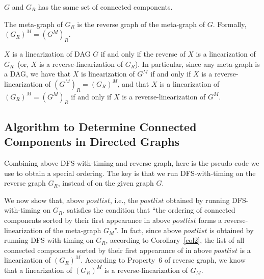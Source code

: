 \begin{property}
$G$ and $G_R$ has the same set of connected components. %
\end{property}


\begin{property}
The meta-graph of $G_R$ is the reverse graph of the meta-graph of $G$. Formally, $(G_R)^M = (G^M)_R$.
\end{property}

\begin{property}
$X$ is a linearization of DAG $G$ if and only if the reverse of $X$ is a linearization of $G_R$~(or, $X$ is a reverse-linearization of $G_R$).
In particular, since any meta-graph is a DAG, we have that 
$X$ is linearization of $G^M$ if and only if $X$ is a reverse-linearization of $(G^M)_R = (G_R)^M$,
and that $X$ is a linearization of $(G_R)^M = (G^M)_R$ if and only if $X$ is a reverse-linearization of $G^M$.
\end{property}


\subsection*{Algorithm to Determine Connected Components in Directed Graphs}

Combining above DFS-with-timing and reverse graph, here is the pseudo-code we use to obtain a special ordering.
The key is that we run DFS-with-timing on the reverse graph $G_R$, instead of on the given graph $G$.

\begin{algorithmblock}[0.8\textwidth]
	\xxx
	\xxx
	\xxx
	\xxx
\end{algorithmblock}

We now show that, above $postlist$, i.e., the $postlist$ obtained by running DFS-with-timing on $G_R$,
satisfies the condition that ``the ordering of connected components sorted by their first appearance in above
$postlist$ forms a reverse-linearization of the meta-graph $G_M$''.
In fact, since above $postlist$ is obtained by running DFS-with-timing on $G_R$,
according to Corollary~\ref{col2}, 
the list of all connected components sorted by their first appearance of in above $postlist$ is a linearization of $(G_R)^M$.
According to Property~6 of reverse graph, we know that a linearization of $(G_R)^M$ is a reverse-linearization of $G_M$.

